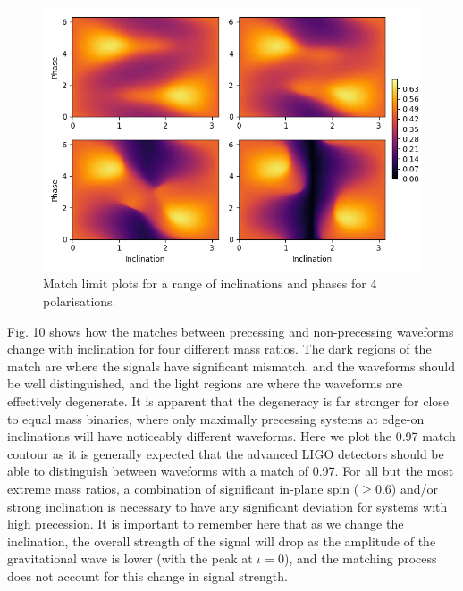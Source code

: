 \documentclass[11pt]{article}
\begin{document}
\begin{figure}
	\includegraphics[width=1\textwidth]{fig12.png}
	\centering
	\caption{Match limit plots for a range of inclinations and phases for 4 polarisations.}
	\centering
\end{figure}

Fig. 10 shows how the matches between precessing and non-precessing waveforms change with inclination for four different mass ratios. The dark regions of the match are where the signals have significant mismatch, and the waveforms should be well distinguished, and the light regions are where the waveforms are effectively degenerate. It is apparent that the degeneracy is far stronger for close to equal mass binaries, where only maximally precessing systems at edge-on inclinations will have noticeably different waveforms. Here we plot the 0.97 match contour as it is generally expected that the advanced LIGO detectors should be able to distinguish between waveforms with a match of 0.97. For all but the most extreme mass ratios, a combination of significant in-plane spin ($\geq0.6$) and/or strong inclination is necessary to have any significant deviation for systems with high precession. It is important to remember here that as we change the inclination, the overall strength of the signal will drop as the amplitude of the gravitational wave is lower (with the peak at $\iota=0$), and the matching process does not account for this change in signal strength.
\end{document}
